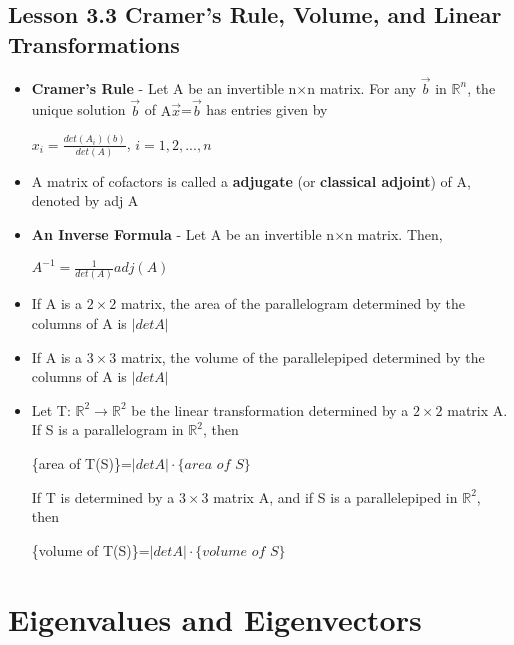 \documentclass{report}
\newcommand{\Ax}{A$\vec{x}$}
\newcommand{\nxn}{n$\times$n}
\newcommand{\Rn}{$\mathbb{R}^n$}
\begin{document}
	\newpage
\section{Lesson 3.3 Cramer's Rule, Volume, and Linear Transformations}
	\begin{itemize}\addtolength{\leftskip}{2em}
		\item \textbf{Cramer's Rule} - Let A be an invertible {\nxn} matrix. For any $\vec{b}$ in {\Rn}, the unique solution $\vec{b}$ of {\Ax}=$\vec{b}$ has entries given by
		\begin{center}
		$x_i=\frac{det(A_i)(b)}{det(A)}$,   $i=1,2,...,n$
		\end{center}
		\item A matrix of cofactors is called a \textbf{adjugate} (or \textbf{classical adjoint}) of A, denoted by adj A
		\item \textbf{An Inverse Formula} - Let A be an invertible {\nxn} matrix. Then, \begin{center}
		$A^{-1}=\frac{1}{det(A)}adj(A)$
		\end{center}
		\item If A is a $2\times 2$ matrix, the area of the parallelogram determined by the columns of A is $|det A|$
		\item If A is a $3\times 3$ matrix, the volume of the parallelepiped determined by the columns of A is $|det A|$
		\item Let T: $\mathbb{R}^2 \rightarrow \mathbb{R}^2$ be the linear transformation determined by a $2\times 2$ matrix A. If S is a parallelogram in $\mathbb{R}^2$, then
		\begin{center}
		\{area of T(S)\}=$|det A|\cdot\{area\,\,of\,\,S\}$
		\end{center}
		If T is determined by a $3\times 3$ matrix A, and if S is a parallelepiped in $\mathbb{R}^2$, then 
		\begin{center}
		\{volume of T(S)\}=$|det A|\cdot\{volume\,\,of\,\,S\}$
		\end{center}
	\end{itemize}
	  \setcounter{chapter}{+4}
\chapter{Eigenvalues and Eigenvectors}
\end{document}
